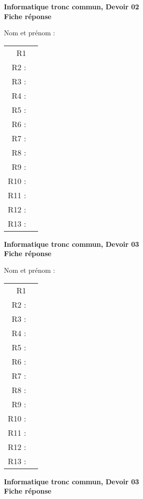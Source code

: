 \documentclass[francais,a4paper,div=19,12 pt]{scrartcl}
\begin{document}
\pagestyle{empty}
\newcommand{\rep}{\fbox{\phantom{\raisebox{0pt}[.5cm][.3cm]{}\makebox[9.5cm]{}}}}
\begin{center}
 \textbf{Informatique tronc commun, Devoir 02}\\
 \textbf{Fiche réponse}
\end{center}

\medskip{}
 Nom  et prénom : \hfill 

\bigskip{}

\centerline{}
\medskip{}
\begin{center}
\begin{tabular}{rc}
R1  & \rep \\[1 em] 
R2 : & \rep \\[1 em] 
R3 : & \rep \\[1 em] 
R4 : & \rep \\[1 em] 
R5 : & \rep \\[1 em] 
R6 : & \rep \\[1 em] 
R7 : & \rep \\[1 em] 
R8 : & \rep \\[1 em] 
R9 : & \rep \\[1 em] 
R10 : & \rep \\[1 em] 
R11 : & \rep \\[1 em] 
R12 : & \rep \\[1 em] 
R13 : & \rep \\[1 em] 
\end{tabular}
\end{center}\newpage
\begin{center}
 \textbf{Informatique tronc commun, Devoir 03}\\
 \textbf{Fiche réponse}
\end{center}

\medskip{}
 Nom  et prénom : \hfill 

\bigskip{}

\centerline{}
\medskip{}
\begin{center}
\begin{tabular}{rc}
R1  & \rep \\[1 em] 
R2 : & \rep \\[1 em] 
R3 : & \rep \\[1 em] 
R4 : & \rep \\[1 em] 
R5 : & \rep \\[1 em] 
R6 : & \rep \\[1 em] 
R7 : & \rep \\[1 em] 
R8 : & \rep \\[1 em] 
R9 : & \rep \\[1 em] 
R10 : & \rep \\[1 em] 
R11 : & \rep \\[1 em] 
R12 : & \rep \\[1 em] 
R13 : & \rep \\[1 em] 
\end{tabular}
\end{center}\newpage
\begin{center}
 \textbf{Informatique tronc commun, Devoir 03}\\
 \textbf{Fiche réponse}
\end{center}
\end{document}
